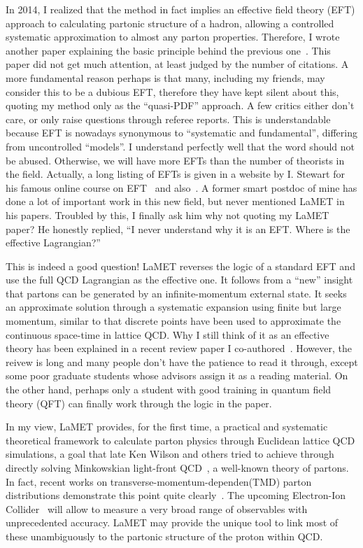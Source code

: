 \documentclass[prd,aps,twocolumn,preprintnumbers,showpacs,nofootinbib,superscriptaddress,notitlepage]{revtex4-1}
\begin{document}
In 2014, I realized that the method in fact implies an effective
field theory (EFT) approach to calculating partonic structure of a hadron,
allowing a controlled systematic approximation to almost any parton properties.
Therefore, I wrote
another paper explaining the basic principle behind the previous one~\cite{Ji:2014gla}.
This paper did not get much attention, at least judged by the number of citations.
A more fundamental reason perhaps is that many, including my friends,
may consider this to be a dubious EFT, therefore they have
kept silent about this, quoting my method only as the ``quasi-PDF'' approach.
A few critics either don't care, or only raise questions through referee reports.
This is understandable because EFT is nowadays synonymous to ``systematic and
fundamental'', differing from uncontrolled ``models''.
I understand perfectly well that the word should not be abused.
Otherwise, we will have more EFTs than the number of theorists in the field.
Actually, a long listing of EFTs is given in a website
by I. Stewart for his famous online course on EFT~\cite{Stewart:2020aa}
and also~\cite{Manohar:2018aog,Davidson:2020xfi}.
A former smart postdoc of mine has done a lot of important work
in this new field, but never mentioned LaMET in his papers. Troubled
by this, I finally ask him why not quoting my LaMET paper? He honestly
replied, ``I never understand why it is an EFT. Where is the
effective Lagrangian?''

This is indeed a good question! LaMET reverses the logic of a
standard EFT and use the full QCD Lagrangian as the effective one.
It follows from a ``new'' insight that partons can be generated by an
infinite-momentum external state. It seeks an approximate solution through a
systematic expansion using finite but large momentum, similar to that
discrete points have been used to approximate the continuous space-time in lattice QCD.
Why I still think of it as an effective theory has been explained in a recent review paper
I co-authored~\cite{Ji:2020ect}.  However, the reivew is long and many people don't
have the patience to read it through, except some poor graduate students
whose advisors assign it as a reading material. On the other hand,
perhaps only a student with good training in quantum field theory (QFT) can
finally work through the logic in the paper.

In my view, LaMET provides, for the first time, a practical and
systematic theoretical framework to calculate parton physics
through Euclidean lattice QCD simulations, a goal
that late Ken Wilson and others tried to achieve through directly solving
Minkowskian light-front QCD~\cite{Wilson:1994fk,Brodsky:1997de}, a well-known theory
of partons. In fact, recent works on transverse-momentum-dependen(TMD) parton distributions
demonstrate this point quite clearly~\cite{Ji:2018hvs,Ebert:2019okf,Ji:2019ewn,Vladimirov:2020ofp}.
The upcoming Electron-Ion Collider~\cite{Accardi:2012qut} will allow to measure
a very broad range of observables with unprecedented accuracy. LaMET may provide the
unique tool to link most of these unambiguously to the partonic
structure of the proton within QCD.
\end{document}
